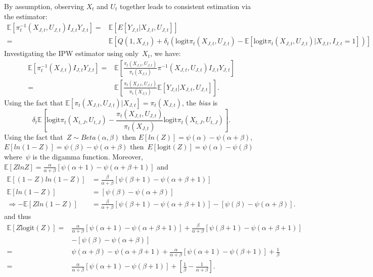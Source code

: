 \documentclass[11pt]{amsart}
\numberwithin{equation}{section}
\theoremstyle{plain}
\def\logit{\text{logit}}
\def\EE{\mathbb{E}}
\begin{document}
 By assumption, observing $X_t$ and $U_t$ together leads to consistent estimation via the estimator:
\begin{align*}
\EE\left[\pi^{-1}_t (X_{J,t}, U_{J,t}) I_{J,t} Y_{J,t} \right]
= &\EE[ E[ Y_{J,t} | X_{J,t}, U_{J,t}] ] \\
= &\EE \left[ Q(1,X_{J,t}) + \delta_t \left( \logit \pi_t (X_{J,t}, U_{J,t}) - \EE \left[ \logit \pi_t (X_{J,t}, U_{J,t}) | X_{J,t}, I_{J,t} = 1 \right] \right) \right]
\end{align*}
 Investigating the IPW estimator using only~$X_t$, we have:
\begin{align*}
\EE\left[\pi^{-1}_t (X_{J,t}) I_{J,t} Y_{J,t} \right]
=&\EE\left[\frac{\pi_t (X_{J,t}, U_{J,t})}{\pi_t (X_{J,t})} \pi^{-1} (X_{J,t}, U_{J,t}) I_{J,t} Y_{J,t} \right] \\
= &\EE\left[ \frac{\pi_t (X_{J,t}, U_{J,t})}{\pi_t (X_{J,t})} \EE[ Y_{J,t} | X_{J,t}, U_{J,t}] \right].
\end{align*}
Using the fact that $\EE \left[ \pi_t (X_{J,t}, U_{J,t}) | X_{J,t} \right] = \pi_{t} (X_{J,t})$, the \emph{bias} is
$$
\delta_t \EE \left[ \logit \pi_t (X_{t,J}, U_{t,J}) - \frac{\pi_t (X_{J,t}, U_{J,t})}{\pi_t (X_{J,t})} \logit \pi_t (X_{t,J}, U_{t,J}) \right].
$$
Using the fact that~$Z \sim Beta(\alpha, \beta)$ then $E[ ln(Z) ] = \psi(\alpha) - \psi(\alpha + \beta)$, $E[ ln(1-Z) ] = \psi(\beta) - \psi(\alpha + \beta)$ then~$E[ \logit (Z) ] = \psi(\alpha) - \psi(\beta)$ where~$\psi$ is the digamma function.  Moreover,~$\EE[ Z ln Z ] = \frac{\alpha}{\alpha + \beta} \left[ \psi(\alpha + 1) - \psi(\alpha + \beta +1) \right]$ and
\begin{align*}
\EE \left[ (1-Z) ln(1-Z) \right] &= \frac{\beta}{\alpha + \beta} \left[ \psi(\beta + 1) - \psi(\alpha + \beta +1) \right] \\
\EE \left[ ln(1-Z) \right] &= \left[ \psi(\beta) - \psi(\alpha + \beta) \right] \\
\Rightarrow - \EE \left[ Z ln(1-Z) \right] &= \frac{\beta}{\alpha + \beta} \left[ \psi(\beta + 1) - \psi(\alpha + \beta +1) \right] - \left[ \psi(\beta) - \psi(\alpha + \beta) \right].
\end{align*}
and thus
\begin{align*}
\EE \left[ Z \logit(Z) \right] =& \frac{\alpha}{\alpha + \beta} \left[ \psi(\alpha + 1) - \psi(\alpha + \beta +1) \right] + \frac{\beta}{\alpha + \beta} \left[ \psi(\beta + 1) - \psi(\alpha + \beta +1) \right] \\
&- \left[ \psi(\beta) - \psi(\alpha + \beta) \right] \\
=& \psi(\alpha + \beta) - \psi(\alpha + \beta +1) + \frac{\alpha}{\alpha + \beta} \left[ \psi(\alpha + 1) - \psi(\beta+1) \right] + \frac{1}{\beta} \\
=& \frac{\alpha}{\alpha + \beta} \left[ \psi(\alpha + 1) - \psi(\beta+1) \right] + \left[ \frac{1}{\beta} - \frac{1}{\alpha + \beta} \right].
\end{align*}
\end{document}
